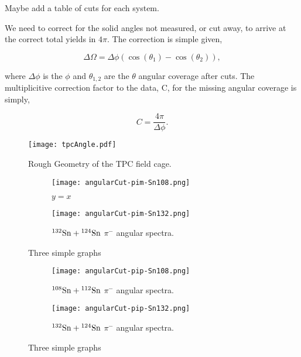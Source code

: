Maybe add a table of cuts for each system. 

We need to correct for the solid angles not measured, or cut away, to arrive at the correct total yields in $4\pi$. The correction is simple given,

\begin{equation}
\Delta\Omega = \Delta\phi(\cos(\theta_1) - \cos(\theta_2)),
\end{equation}

where $\Delta\phi$ is the $\phi$ and $\theta_{1,2}$ are the $\theta$ angular coverage after cuts. The multiplicitive correction factor to the data, C, for the missing angular coverage is simply,  

\begin{equation}
C = \frac{4\pi}{\Delta\phi}.
\end{equation}


\begin{figure}[!htb]
\texttt{[image: tpcAngle.pdf]}
\caption{Rough Geometry of the TPC field cage.}
\label{fig:angleEffExplanation}
\end{figure}


\begin{figure}[!htb]
     \centering
     \begin{subfigure}[b]{0.49\textwidth}
         \centering
         \texttt{[image: angularCut-pim-Sn108.png]}
         \caption{$y=x$}
         \label{fig:pim108angle}
     \end{subfigure}
     \hfill
     \begin{subfigure}[b]{0.49\textwidth}
         \centering
         \texttt{[image: angularCut-pim-Sn132.png]}
         \caption{${}^{132}\mathrm{Sn} + {}^{124}\mathrm{Sn}$ $\pi^-$ angular spectra.}
         \label{fig:pim132angle}
     \end{subfigure}
        \caption{Three simple graphs}
        \label{fig:pim}
\end{figure}


\begin{figure}[!htb]
     \centering
     \begin{subfigure}[b]{0.49\textwidth}
         \centering
         \texttt{[image: angularCut-pip-Sn108.png]}
         \caption{${}^{108}\mathrm{Sn} + {}^{112}\mathrm{Sn}$ $\pi^-$ angular spectra.}
         \label{fig:pip108angle}
     \end{subfigure}
     \hfill
     \begin{subfigure}[b]{0.49\textwidth}
         \centering
         \texttt{[image: angularCut-pip-Sn132.png]}
         \caption{${}^{132}\mathrm{Sn} + {}^{124}\mathrm{Sn}$ $\pi^-$ angular spectra.}
         \label{fig:pip132angle}
     \end{subfigure}
        \caption{Three simple graphs}
        \label{fig:pip}
\end{figure}
